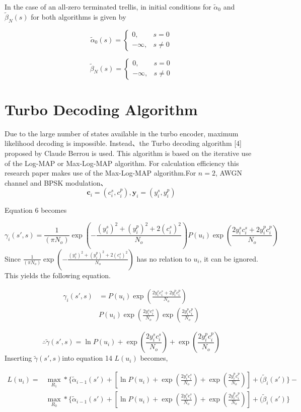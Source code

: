 \documentclass[20 pts]{article}
\begin{document}
In the case of an all-zero terminated trellis, in initial conditions for  $\widetilde{\alpha}_0$ and $\widetilde{\beta}_N(s)$ for both algorithms is given by

\[
    \widetilde{\alpha}_0(s)= 
\begin{cases}
   0,& s= 0\\        -\infty,              &  s\neq 0
\end{cases}
\]

\[
   \widetilde{\beta}_N(s)= 
\begin{cases}
   0,& s= 0\\        -\infty,              &  s\neq 0
\end{cases}
\]

\section{Turbo Decoding Algorithm}
Due to the large number of states available in the turbo encoder, maximum likelihood decoding is impossible. Instead、the  Turbo decoding algorithm [4] proposed by Claude Berrou is used. This algorithm is based on the iterative use of the Log-MAP or Max-Log-MAP algorithm. For calculation efficiency this research paper makes use of the Max-Log-MAP algorithm.For $n=2$, AWGN channel and BPSK modulation、
$$\boldsymbol{c}_i=(c_i^s,c_i^p),  \boldsymbol{y}_i=(y_i^s,y_i^p)$$

Equation 6 becomes

$$
\gamma_i(s',s)=\frac{1}{(\pi N_o)}\exp(-\frac{(y_i^s)^2+(y_i^p)^2+2(c_i^s)^2}{N_o})P(u_i)\exp(\frac{2y_i^sc_i^s+2y_i^pc_i^p}{N_o})
$$
Since $\frac{1}{(\pi N_o)}\exp(-\frac{(y_i^s)^2+(y_i^p)^2+2(c_i^s)^2}{N_o})$ has no relation to $u_i$, it can be ignored. This yields the following equation.

\begin{equation}
\begin{split}
\gamma_i(s',s)&=P(u_i)\exp(\frac{2y_i^sc_i^s+2y_i^pc_i^p}{N_o})\\
&P(u_i)\exp(\frac{2y_i^sc_i^s}{N_o})\exp(\frac{2y_i^pc_i^p}{N_o})
\end{split}
\end{equation}

$$\therefore\widetilde{\gamma}(s',s)= \ln P(u_i)+\exp(\frac{2y_i^sc_i^s}{N_o})+\exp(\frac{2y_i^pc_i^p}{N_o})$$
Inserting $\widetilde{\gamma}(s',s)$into equation 14 $L(u_i)$ becomes,

\begin{equation}
\begin{split}
L(u_i)=&\max_{R_1}*\Big\{\widetilde{\alpha}_{i-1}(s')+[\ln P(u_i)+\exp(\frac{2y_i^sc_i^s}{N_o})+\exp(\frac{2y_i^pc_i^p}{N_o})]+(\widetilde{\beta}_{i}(s')\Big\}-\\&\max_{R_0}*\Big\{\widetilde{\alpha}_{i-1}(s')+[\ln P(u_i)+\exp(\frac{2y_i^sc_i^s}{N_o})+\exp(\frac{2y_i^pc_i^p}{N_o})]+(\widetilde{\beta}_{i}(s')\Big\}
\end{split}
\end{equation}
\end{document}
